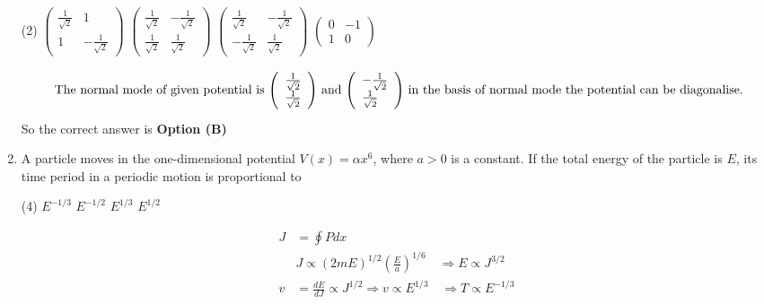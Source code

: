 \begin{enumerate}
	{}
\begin{tasks}(2)
\task[\textbf{A.}] $\left(\begin{array}{cc}\frac{1}{\sqrt{2}} & 1 \\ 1 & -\frac{1}{\sqrt{2}}\end{array}\right)$
\task[\textbf{B.}] $\left(\begin{array}{ll}\frac{1}{\sqrt{2}} & -\frac{1}{\sqrt{2}} \\ \frac{1}{\sqrt{2}} & \frac{1}{\sqrt{2}}\end{array}\right)$
\task[\textbf{C.}] $\left(\begin{array}{cc}\frac{1}{\sqrt{2}} & -\frac{1}{\sqrt{2}} \\ -\frac{1}{\sqrt{2}} & \frac{1}{\sqrt{2}}\end{array}\right)$
\task[\textbf{D.}] $\left(\begin{array}{cc}0 & -1 \\ 1 & 0\end{array}\right)$
\end{tasks}
\begin{answer}
\begin{align*}
\intertext{ The normal mode of given potential is $\left(\begin{array}{l}\frac{1}{\sqrt{2}} \\ \frac{1}{\sqrt{2}}\end{array}\right)$ and $\left(\begin{array}{l}-\frac{1}{\sqrt{2}} \\ \frac{1}{\sqrt{2}}\end{array}\right)$ in the basis of normal mode the potential can be diagonalise.}
\end{align*}
So the correct answer is \textbf{Option (B)}
\end{answer}
	\item  A particle moves in the one-dimensional potential $V(x)=\alpha x^{6}$, where $a>0$ is a constant. If the total energy of the particle is $E$, its time period in a periodic motion is proportional to
{	}
\begin{tasks}(4)
\task[\textbf{A.}] $E^{-1 / 3}$
\task[\textbf{B.}] $E^{-1 / 2}$
\task[\textbf{C.}] $E^{1 / 3}$
\task[\textbf{D.}] $E^{1 / 2}$
\end{tasks}
\begin{answer}
\begin{align*}
J&=\oint P d x\\
&J \propto(2 m E)^{1 / 2}\left(\frac{E}{a}\right)^{1 / 6} \quad \Rightarrow E \propto J^{3 / 2} \\ v&=\frac{d E}{d J} \propto J^{1 / 2} \Rightarrow v \propto E^{1 / 3} \quad \Rightarrow T \propto E^{-1 / 3}

\end{align*}
\end{answer}
\end{enumerate}
